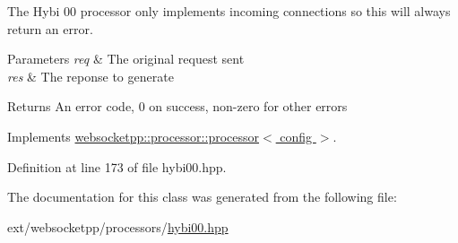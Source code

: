 The Hybi 00 processor only implements incoming connections so this will always return an error.


\begin{DoxyParams}{Parameters}
{\em req} & The original request sent \\
\hline
{\em res} & The reponse to generate \\
\hline
\end{DoxyParams}
\begin{DoxyReturn}{Returns}
An error code, 0 on success, non-\/zero for other errors 
\end{DoxyReturn}


Implements \hyperlink{classwebsocketpp_1_1processor_1_1processor_a2567795de600f5e19cb8f5c205c32bac}{websocketpp\+::processor\+::processor$<$ config $>$}.



Definition at line 173 of file hybi00.\+hpp.



The documentation for this class was generated from the following file\+:\begin{DoxyCompactItemize}
\item 
ext/websocketpp/processors/\hyperlink{hybi00_8hpp}{hybi00.\+hpp}\end{DoxyCompactItemize}
